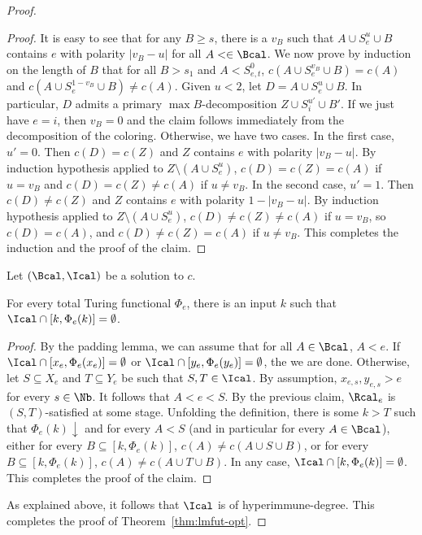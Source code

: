\begin{proof}
\begin{proof}
It is easy to see that for any $B \geq s$, there is a $v_B$ such that
$A \cup S^u_e \cup B$ contains $e$ with polarity $|v_B - u|$ for all $A < \in \Bcal$. We now prove by induction on the length of $B$ that for all $B > s_1$ and $A < S^0_{e,t}$, $c(A \cup S^{v_B}_e \cup B) = c(A)$ and $c(A \cup S^{1-v_B}_e \cup B) \neq c(A)$. Given $u < 2$, let $D = A \cup S^u_e \cup B$. In particular, $D$ admits a primary $\max B$-decomposition $Z \cup S^{u'}_i \cup B'$. If we just have $e = i$, then $v_B = 0$ and the claim follows immediately from the decomposition of the coloring. Otherwise, we have two cases.
In the first case, $u' = 0$. Then $c(D) = c(Z)$ and $Z$ contains $e$ with polarity $|v_B - u|$. By induction hypothesis applied to $Z \setminus (A \cup S^u_e)$, $c(D) = c(Z) = c(A)$ if $u = v_B$ and $c(D) = c(Z) \neq c(A)$ if $u \neq v_B$. In the second case, $u' = 1$. Then $c(D) \neq c(Z)$ and $Z$ contains $e$ with polarity $1-|v_B-u|$. By induction hypothesis applied to $Z \setminus (A \cup S^u_e)$, $c(D) \neq c(Z) \neq c(A)$ if $u = v_B$, so $c(D) = c(A)$, and $c(D) \neq c(Z) = c(A)$ if $u \neq v_B$. This completes the induction and the proof of the claim.
\end{proof}

Let $(\Bcal, \Ical)$ be a solution to $c$.

\begin{claim}
	For every total Turing functional $\Phi_e$, there is an input $k$
	such that $\Ical \cap [k, \Phi_e(k)] = \emptyset$.
\end{claim}
\begin{proof}
By the padding lemma, we can assume that for all $A \in \Bcal$,
$A < e$. 
If $\Ical \cap [x_e, \Phi_e(x_e)] = \emptyset$ or $\Ical \cap [y_e, \Phi_e(y_e)] = \emptyset$, the we are done. Otherwise, let $S \subseteq X_e$ and $T \subseteq Y_e$ be such that $S, T \in \Ical$.
By assumption, $x_{e,s}, y_{e,s} > e$ for every $s \in \Nb$.
It follows that $A < e < S$. By the previous claim, $\Rcal_e$ is $(S,T)$-satisfied at some stage. Unfolding the definition, there is some $k > T$
such that $\Phi_e(k)\downarrow$ and for every $A < S$ (and in particular for every $A \in \Bcal$), either for every $B \subseteq [k, \Phi_e(k)]$, $c(A) \neq c(A \cup S \cup B)$,
or for every $B \subseteq [k, \Phi_e(k)]$, $c(A) \neq c(A \cup T \cup B)$.
In any case, $\Ical \cap [k, \Phi_e(k)] = \emptyset$. This completes the proof of the claim.
\end{proof}

As explained above, it follows that $\Ical$ is of hyperimmune-degree.
This completes the proof of Theorem~\ref{thm:lmfut-opt}.
\end{proof}

